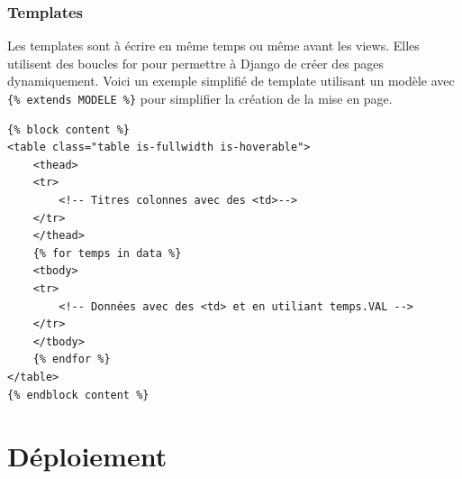 \documentclass{article}
\begin{document}
\subsubsection{Templates}
Les templates sont à écrire en même temps ou même avant les views.
Elles utilisent des boucles for pour permettre à Django de créer des pages dynamiquement.
Voici un exemple simplifié de template utilisant un modèle avec \verb|{% extends MODELE %}| pour simplifier la création de la mise en page.
\begin{listing}[H]
    \begin{verbatim}
{% block content %}
<table class="table is-fullwidth is-hoverable">
    <thead>
    <tr>
        <!-- Titres colonnes avec des <td>-->
    </tr>
    </thead>
    {% for temps in data %}
    <tbody>
    <tr>
        <!-- Données avec des <td> et en utiliant temps.VAL -->
    </tr>
    </tbody>
    {% endfor %}
</table>
{% endblock content %}
    \end{verbatim}
    \caption{}
    \label{}
\end{listing}

\section{Déploiement}
\end{document}
